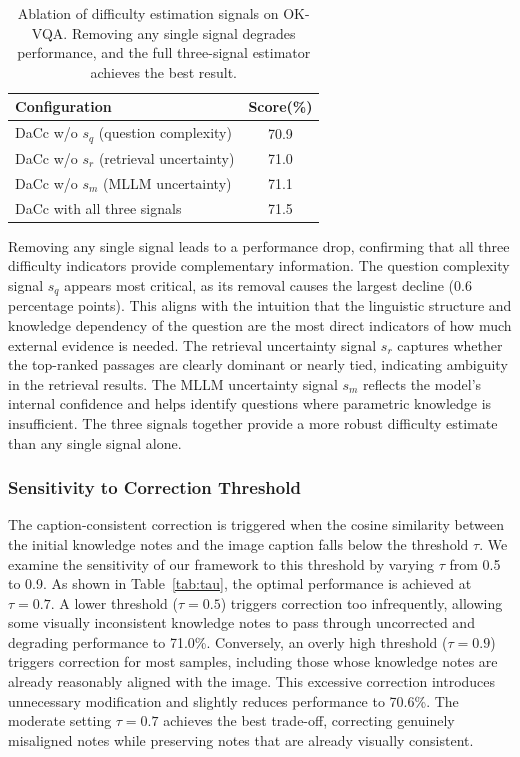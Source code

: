 \documentclass[manuscript,screen,review]{acmart}
\begin{document}
\begin{table}[t]
\centering
\caption{Ablation of difficulty estimation signals on OK-VQA. Removing any single signal degrades performance, and the full three-signal estimator achieves the best result.}
\label{tab:difficulty}
\begin{tabular}{l c}
\hline
Configuration & Score(\%) \\
\hline
DaCc w/o $s_q$ (question complexity)    & 70.9 \\
DaCc w/o $s_r$ (retrieval uncertainty)  & 71.0 \\
DaCc w/o $s_m$ (MLLM uncertainty)       & 71.1 \\
DaCc with all three signals             & 71.5 \\
\hline
\end{tabular}
\end{table}

Removing any single signal leads to a performance drop, confirming that all three difficulty indicators provide complementary information. The question complexity signal $s_q$ appears most critical, as its removal causes the largest decline (0.6 percentage points). This aligns with the intuition that the linguistic structure and knowledge dependency of the question are the most direct indicators of how much external evidence is needed. The retrieval uncertainty signal $s_r$ captures whether the top-ranked passages are clearly dominant or nearly tied, indicating ambiguity in the retrieval results. The MLLM uncertainty signal $s_m$ reflects the model's internal confidence and helps identify questions where parametric knowledge is insufficient. The three signals together provide a more robust difficulty estimate than any single signal alone.

\subsubsection{Sensitivity to Correction Threshold}

The caption-consistent correction is triggered when the cosine similarity between the initial knowledge notes and the image caption falls below the threshold $\tau$. We examine the sensitivity of our framework to this threshold by varying $\tau$ from 0.5 to 0.9. As shown in Table~\ref{tab:tau}, the optimal performance is achieved at $\tau=0.7$. A lower threshold ($\tau=0.5$) triggers correction too infrequently, allowing some visually inconsistent knowledge notes to pass through uncorrected and degrading performance to 71.0\%. Conversely, an overly high threshold ($\tau=0.9$) triggers correction for most samples, including those whose knowledge notes are already reasonably aligned with the image. This excessive correction introduces unnecessary modification and slightly reduces performance to 70.6\%. The moderate setting $\tau=0.7$ achieves the best trade-off, correcting genuinely misaligned notes while preserving notes that are already visually consistent.
\end{document}
